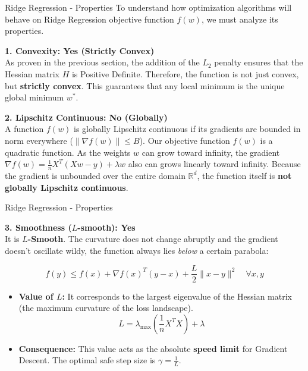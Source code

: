 \documentclass[10pt]{beamer}
\begin{document}
\begin{frame}{Ridge Regression - Properties}
    To understand how optimization algorithms will behave on Ridge Regression objective function $f(w)$, we must analyze its properties. 

    \vspace{0.3cm}
    \textbf{1. Convexity: Yes (Strictly Convex)} \\
    As proven in the previous section, the addition of the $L_2$ penalty ensures that the Hessian matrix $H$ is Positive Definite. Therefore, the function is not just convex, but \textbf{strictly convex}. This guarantees that any local minimum is the unique global minimum $w^*$.

    \vspace{0.3cm}
    \textbf{2. Lipschitz Continuous: No (Globally)} \\
    A function $f(w)$ is globally Lipschitz continuous if its gradients are bounded in norm everywhere ($\| \nabla f(w) \| \le B$). 
    Our objective function $f(w)$ is a quadratic function. As the weights $w$ can grow toward infinity, the gradient $\nabla f(w) = \frac{1}{n} X^T (Xw - y) + \lambda w$ also can grows linearly toward infinity. Because the gradient is unbounded over the entire domain $\mathbb{R}^d$, the function itself is \textbf{not globally Lipschitz continuous}.
\end{frame}

\begin{frame}{Ridge Regression - Properties}

    \textbf{3. Smoothness ($L$-smooth): Yes} \\
    It is \textbf{$L$-Smooth}.
    The curvature does not change abruptly and the gradient doesn't oscillate wildy, the function always lies \textit{below} a certain parabola: 

    $$f(y) \le f(x) + \nabla f(x)^T (y - x) + \frac{L}{2} \|x - y\|^2 \quad \forall x,y$$

    \begin{itemize}
        \item \textbf{Value of $L$:} It corresponds to the largest eigenvalue of the Hessian matrix (the maximum curvature of the loss landscape).
          $$L = \lambda_{\max}\left(\frac{1}{n}X^T X\right) + \lambda$$
        \item \textbf{Consequence:} This value acts as the absolute \textbf{speed limit} for Gradient Descent. The optimal safe step size is $\gamma = \frac{1}{L}$.
    \end{itemize}
\end{frame}
\end{document}

